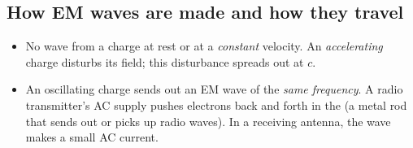 \subsection{How EM waves are made and how they travel}

\begin{itemize}
  \item No wave from a charge at rest or at a \emph{constant} velocity. An \emph{accelerating}
        charge disturbs its field; this disturbance spreads out at $c$.
  \item An oscillating charge sends out an EM wave of the \emph{same frequency}. A radio
        transmitter's AC supply pushes electrons back and forth in the  (a metal rod
        that sends out or picks up radio waves). In a receiving antenna, the wave makes a small
        AC current.
\end{itemize}


